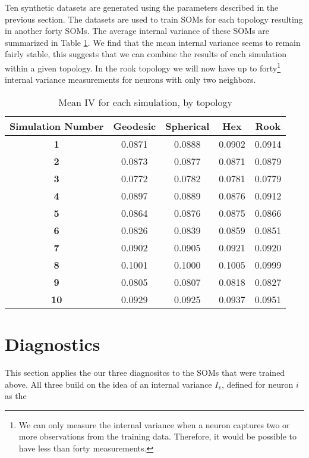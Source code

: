 Ten synthetic datasets are generated using the parameters described in the
previous section. The datasets are used to train SOMs for each topology
resulting in another forty SOMs. The average internal variance of these SOMs
are summarized in Table \ref{ivtable3}.  We find that the mean internal
variance seems to remain fairly stable, this suggests that we can combine the
results of each simulation within a given topology. In the rook topology we
will now have up to forty\footnote{We can only measure the internal variance
when a neuron captures two or more observations from the training data.
Therefore, it would be possible to have less than forty measurements.}
internal variance measurements for neurons with only two neighbors.

\begin{table}[hbt]
\centering
\caption{Mean IV for each simulation, by topology}
\label{ivtable3}
\begin{tabular}{|c||c|c|c|c|}
\hline
\textbf{Simulation Number} & Geodesic & Spherical & Hex & Rook \\
\hline
\hline
\textbf{1} & 0.0871 & 0.0888 & 0.0902 & 0.0914 \\
\hline
\textbf{2} & 0.0873 & 0.0877 & 0.0871 & 0.0879 \\
\hline
\textbf{3} & 0.0772 & 0.0782 & 0.0781 & 0.0779 \\
\hline
\textbf{4} & 0.0897 & 0.0889 & 0.0876 & 0.0912 \\
\hline
\textbf{5} & 0.0864 & 0.0876 & 0.0875 & 0.0866 \\
\hline
\textbf{6} & 0.0826 & 0.0839 & 0.0859 & 0.0851 \\
\hline
\textbf{7} & 0.0902 & 0.0905 & 0.0921 & 0.0920 \\
\hline
\textbf{8} & 0.1001 & 0.1000 & 0.1005 & 0.0999 \\
\hline
\textbf{9} & 0.0805 & 0.0807 & 0.0818 & 0.0827 \\
\hline
\textbf{10} & 0.0929 & 0.0925 & 0.0937 & 0.0951 \\
\hline
\end{tabular} \end{table}

\section{Diagnostics}
This section applies the our three diagnositcs to the SOMs that were trained
above.  All three build on the idea of an internal variance \(I_v\), defined
for neuron \(i\) as the 

